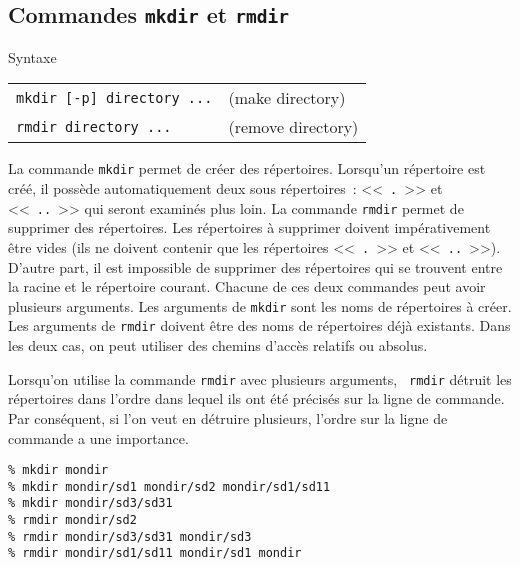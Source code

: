 \subsection{Commandes {\tt mkdir} et {\tt rmdir}}

\begin{definition}{Syntaxe}
\begin{tabular}{ll}
	\index{mkdir@\texttt{mkdir}}\verb=mkdir [-p] directory ...=	& (make directory) \\
	\index{rmdir@\texttt{rmdir}}\verb=rmdir directory ...=		& (remove directory)\\
\end{tabular}
\end{definition}

La commande {\tt mkdir} permet de cr{\'e}er des r{\'e}pertoires. Lorsqu'un
r{\'e}pertoire est cr{\'e}{\'e}, il poss{\`e}de automatiquement deux sous r{\'e}pertoires~:
<<~{\tt .}~>> et <<~{\tt ..}~>> qui seront examin{\'e}s plus loin. La commande
{\tt rmdir} permet de supprimer des r{\'e}pertoires. Les r{\'e}pertoires {\`a} supprimer
doivent imp{\'e}rativement {\^e}tre vides (ils ne doivent contenir que les
r{\'e}pertoires <<~{\tt .}~>> et <<~{\tt ..}~>>). D'autre part, il est
impossible de supprimer des r{\'e}pertoires qui se trouvent entre la racine
et le r{\'e}pertoire courant. Chacune de ces deux commandes peut avoir
plusieurs arguments. Les arguments de {\tt mkdir} sont les noms de r{\'e}pertoires
{\`a} cr{\'e}er. Les arguments de {\tt rmdir} doivent {\^e}tre des noms de r{\'e}pertoires
d{\'e}j{\`a} existants. Dans les deux cas, on peut utiliser des chemins d'acc{\`e}s
relatifs ou absolus.

\begin{remarque}
Lorsqu'on utilise la commande {\tt rmdir} avec plusieurs arguments, {\tt
rmdir} d{\'e}truit les r{\'e}pertoires dans l'ordre dans lequel ils ont {\'e}t{\'e}
pr{\'e}cis{\'e}s sur la ligne de commande. Par cons{\'e}quent, si l'on veut en
d{\'e}truire plusieurs, l'ordre sur la ligne de commande a une importance.
\end{remarque}

\begin{example}
\begin{verbatim}
% mkdir mondir
% mkdir mondir/sd1 mondir/sd2 mondir/sd1/sd11
% mkdir mondir/sd3/sd31
% rmdir mondir/sd2
% rmdir mondir/sd3/sd31 mondir/sd3
% rmdir mondir/sd1/sd11 mondir/sd1 mondir
\end{verbatim}
\end{example}


